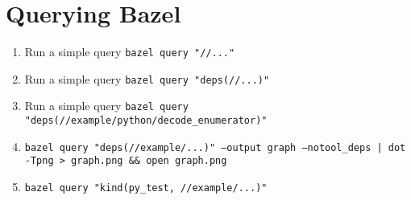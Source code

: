 \documentclass{article}
\begin{document}
\section{Querying Bazel}
\begin{enumerate}
    \item Run a simple query \texttt{bazel query "//..."}
    \item Run a simple query \texttt{bazel query "deps(//...)"}
    \item Run a simple query \texttt{bazel query "deps(//example/python/decode\_enumerator)"}
    \item \texttt{bazel query "deps(//example/...)" --output graph --notool\_deps | dot -Tpng > graph.png \&\& open graph.png}
    \item \texttt{bazel query "kind(py\_test, //example/...)"}
\end{enumerate}
\end{document}
